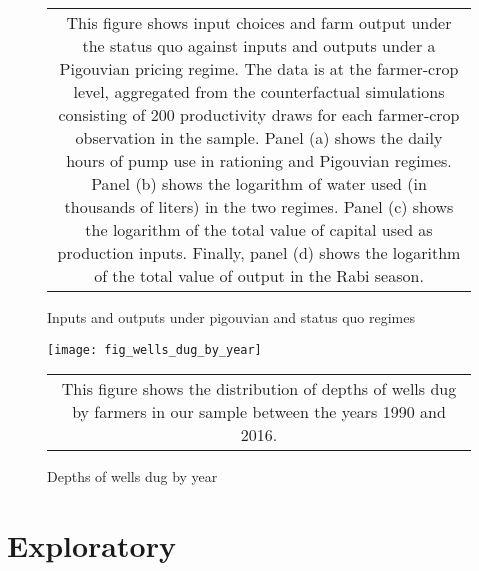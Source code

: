 \documentclass{article}
\numberwithin{table}{section}
\begin{document}
\begin{figure}[htbp]
	\centering
	\caption{Inputs and outputs under pigouvian and status quo regimes}
	\subfiguretopcaptrue
	\begin{tabular*}{1.0\textwidth}{c}
		\multicolumn{1}{p{1.0\hsize}}{\footnotesize This figure shows input choices and farm output under the status quo against inputs and outputs under a Pigouvian pricing regime. The data is at the farmer-crop level, aggregated from the counterfactual simulations consisting of 200 productivity draws for each farmer-crop observation in the sample. Panel (a) shows the daily hours of pump use in rationing and Pigouvian regimes. Panel (b) shows the logarithm of water used (in thousands of liters) in the two regimes. Panel (c) shows the logarithm of the total value of capital used as production inputs. Finally, panel (d) shows the logarithm of the total value of output in the Rabi season.} \\
	\end{tabular*}
\end{figure}



\begin{figure}[htbp]
	\centering\caption{Depths of wells dug by year\label{fig:wellsDugByYear}}
	\texttt{[image: fig\_wells\_dug\_by\_year]}
	\begin{tabular*}{1.0\hsize}{c}
		\multicolumn{1}{p{1.0\hsize}}{\footnotesize This figure shows the distribution of depths of wells dug by farmers in our sample between the years 1990 and 2016.}\\
	\end{tabular*}
\end{figure}





\clearpage

\section{Exploratory}
\end{document}
